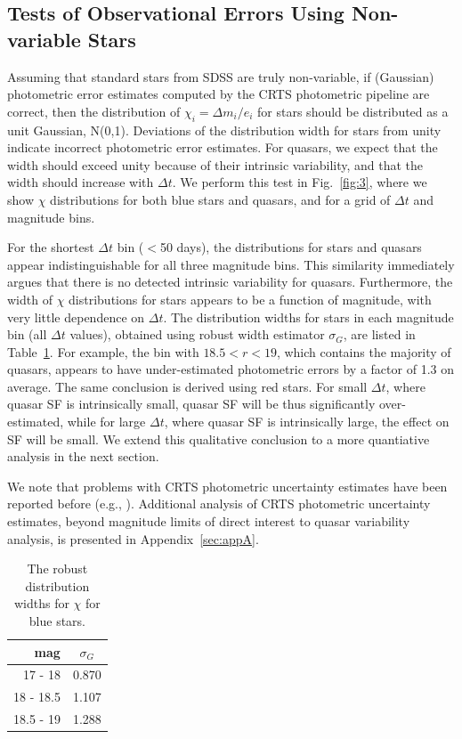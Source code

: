 \documentclass[fleqn,usenatbib]{mnras}  %
\begin{document}
\subsection{Tests of Observational Errors Using Non-variable Stars}
\label{sec:results}

Assuming that standard stars from SDSS are truly non-variable, if (Gaussian) photometric error estimates 
computed by the CRTS photometric pipeline are correct, then the distribution of $\chi_i= \Delta m_i / e_i$ 
for stars should be distributed as a unit Gaussian, N(0,1). Deviations of the distribution width for stars 
from unity indicate incorrect photometric error estimates. For quasars, we expect that the width should
exceed unity because of their intrinsic variability, and that the width should increase with $\Delta t$. 
We perform this test in Fig.~\ref{fig:3}, where we show $\chi$ distributions for both blue stars and quasars, 
and for a grid of $\Delta t$ and magnitude bins. 

For the shortest $\Delta t$ bin ($<$50 days), the distributions for stars and quasars appear indistinguishable
for all three magnitude bins. This similarity immediately argues that there is no detected intrinsic variability
for quasars. Furthermore, the width of $\chi$ distributions for stars appears to be a function of magnitude,
with very little dependence on $\Delta t$. The distribution widths for stars in each magnitude bin (all $\Delta t$
values), obtained using robust width estimator $\sigma_G$, are listed in Table~\ref{tab:fc}. For example,
the bin with $18.5<r<19$, which contains the majority of quasars, appears to have under-estimated photometric
errors by a factor of 1.3 on average. The same conclusion is derived using red stars. For small $\Delta t$, where 
quasar SF is intrinsically small, quasar SF will be thus significantly over-estimated, while for large $\Delta t$, 
where quasar SF is intrinsically large, the effect on SF will be small. We extend this qualitative conclusion 
to a more quantiative analysis in the next section. 

We note that problems with CRTS photometric uncertainty estimates have been reported before
(e.g., \citealt{vaughan2016}). Additional analysis of CRTS photometric uncertainty estimates, beyond magnitude
limits of direct interest to quasar variability analysis, is presented in Appendix~\ref{sec:appA}. 

\begin{table}
\centering
\caption{The robust distribution widths for $\chi$ for blue stars.}
\label{tab:fc}
\begin{tabular}{ r|c } 
\hline
 mag    & $\sigma_G$ \\ 
 \hline
17   - 18    & 0.870   \\
18   - 18.5 & 1.107   \\
18.5 - 19   & 1.288   
\end{tabular}
\end{table}
\end{document}
